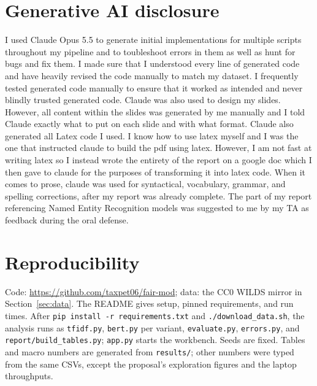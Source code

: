 \section{Generative AI disclosure}
I used Claude Opus 5.5 to generate initial implementations for multiple scripts throughout my pipeline and to toubleshoot errors in them as well as hunt for bugs and fix them. I made sure that I understood every line of generated code and have heavily revised the code manually to match my dataset. I frequently tested generated code manually to ensure that it worked as intended and never blindly trusted generated code. Claude was also used to design my slides. However, all content within the slides was generated by me manually and I told Claude exactly what to put on each slide and with what format. Claude also generated all Latex code I used. I know how to use latex myself and I was the one that instructed claude to build the pdf using latex. However, I am not fast at writing latex so I instead wrote the entirety of the report on a google doc which I then gave to claude for the purposes of transforming it into latex code. When it comes to prose, claude was used for syntactical, vocabulary, grammar, and spelling corrections, after my report was already complete. The part of my report referencing Named Entity Recognition models was suggested to me by my TA as feedback during the oral defense. 

\section*{Reproducibility}
{\raggedright Code: \url{https://github.com/taxpet06/fair-mod}; data: the CC0 WILDS mirror in Section~\ref{sec:data}.
The README gives setup, pinned requirements, and run times. After \texttt{pip install -r requirements.txt} and
\texttt{./download\_data.sh}, the analysis runs as \texttt{tfidf.py}, \texttt{bert.py} per variant, \texttt{evaluate.py},
\texttt{errors.py}, and \texttt{report/build\_tables.py}; \texttt{app.py} starts the workbench. Seeds are fixed.
Tables and macro numbers are generated from \texttt{results/}; other numbers were typed from the same CSVs, except the
proposal's exploration figures and the laptop throughputs.\par}
